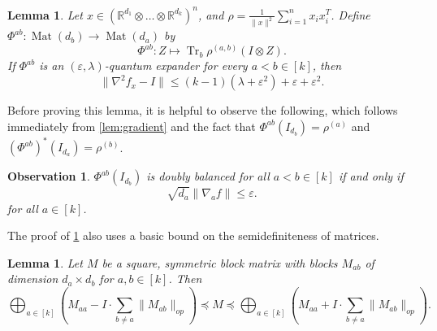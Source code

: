 \documentclass[aos]{imsart}
\newtheorem{obs}[theorem]{Observation}
\newtheorem{lemma}[theorem]{Lemma}
\theoremstyle{definition}
\numberwithin{equation}{section}
\DeclareMathOperator{\mat}{Mat}
\DeclareMathOperator{\tr}{Tr}
\newcommand{\R}{{\mathbb{R}}}
\newcommand{\ot}{\otimes}
\newcommand{\eps}{\varepsilon}
\newcommand{\samp}{x}
\begin{document}
\begin{lemma}\label{lem:expansion-convexity} Let $\samp \in (\R^{d_1} \ot \dots \ot \R^{d_k})^n$, and $\rho = \frac{1}{\|x\|^2} \sum_{i = 1}^n \samp_i \samp_i^T$. Define $\Phi^{ab}:\mat (d_b) \to \mat(d_a)$ by 
$$ \Phi^{ab}: Z \mapsto \tr_b \rho^{(a,b)} \left(I \ot Z\right).$$
If $\Phi^{ab}$ is an $(\eps, \lambda)$-quantum expander for every $a < b \in [k]$, then 
$$ \|\nabla^2 f_\samp - I\| \leq (k-1)( \lambda + \eps^2) + \eps + \eps^2.$$
\end{lemma}
Before proving this lemma, it is helpful to observe the following, which follows immediately from \cref{lem:gradient} and the fact that $\Phi^{ab}(I_{d_b}) = \rho^{(a)}$ and $(\Phi^{ab})^*(I_{d_a}) = \rho^{(b)}$. 
\begin{obs}\label{obs:doubly-gradient}
$\Phi^{ab}(I_{d_b})$ is doubly balanced for all $a<b \in [k]$ if and only if 
$$\sqrt{d_a} \| \nabla_a f\| \leq \eps.$$
for all $a \in [k]$.
\end{obs}
The proof of \cref{lem:expansion-convexity} also uses a basic bound on the semidefiniteness of matrices.
\begin{lemma}\label{lem:block-matrix}
Let $M$ be a square, symmetric block matrix with blocks $M_{ab}$ of dimension $d_a \times d_b$ for $a,b \in [k]$. Then 
$$ \bigoplus_{a \in [k]} \left(M_{aa} - I \cdot \sum_{b \neq a} \|M_{ab}\|_{op}\right) \preceq M \preceq \bigoplus_{a \in [k]} \left(M_{aa} + I \cdot \sum_{b \neq a} \|M_{ab}\|_{op}\right) .$$
\end{lemma}
\end{document}
